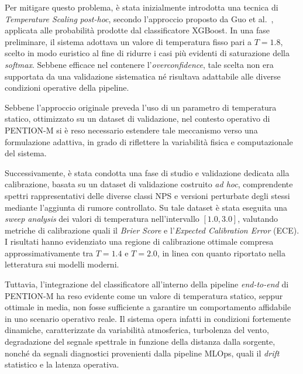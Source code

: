 Per mitigare questo problema, è stata inizialmente introdotta una tecnica di \emph{Temperature Scaling} \textit{post-hoc}, secondo l’approccio proposto da Guo et al.~\cite{guo2017calibration}, applicata alle probabilità prodotte dal classificatore XGBoost. In una fase preliminare, il sistema adottava un valore di temperatura fisso pari a $T = 1.8$, scelto in modo euristico al fine di ridurre i casi più evidenti di saturazione della \textit{softmax}. Sebbene efficace nel contenere l’\textit{overconfidence}, tale scelta non era supportata da una validazione sistematica né risultava adattabile alle diverse condizioni operative della pipeline.

Sebbene l’approccio originale preveda l’uso di un parametro di temperatura statico, ottimizzato su un dataset di validazione, nel contesto operativo di \textsc{PENTION-M} si è reso necessario estendere tale meccanismo verso una formulazione adattiva, in grado di riflettere la variabilità fisica e computazionale del sistema.

Successivamente, è stata condotta una fase di studio e validazione dedicata alla calibrazione, basata su un dataset di validazione costruito \textit{ad hoc}, comprendente spettri rappresentativi delle diverse classi NPS e versioni perturbate degli stessi mediante l’aggiunta di rumore controllato. Su tale dataset è stata eseguita una \emph{sweep analysis} dei valori di temperatura nell’intervallo $[1.0, 3.0]$, valutando metriche di calibrazione quali il \emph{Brier Score} e l’\emph{Expected Calibration Error} (ECE). I risultati hanno evidenziato una regione di calibrazione ottimale compresa approssimativamente tra $T = 1.4$ e $T = 2.0$, in linea con quanto riportato nella letteratura sui modelli moderni.

Tuttavia, l’integrazione del classificatore all’interno della pipeline \textit{end-to-end} di \textsc{PENTION-M} ha reso evidente come un valore di temperatura statico, seppur ottimale in media, non fosse sufficiente a garantire un comportamento affidabile in uno scenario operativo reale. Il sistema opera infatti in condizioni fortemente dinamiche, caratterizzate da variabilità atmosferica, turbolenza del vento, degradazione del segnale spettrale in funzione della distanza dalla sorgente, nonché da segnali diagnostici provenienti dalla pipeline MLOps, quali il \textit{drift} statistico e la latenza operativa.

